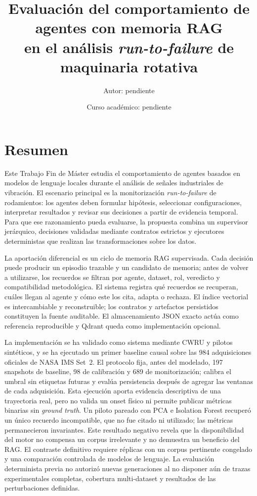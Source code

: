 \documentclass[12pt,a4paper]{report}
\title{
  Evaluación del comportamiento de agentes con memoria RAG\\
  en el análisis \textit{run-to-failure} de maquinaria rotativa
}
\author{Autor: pendiente}
\date{Curso académico: pendiente}
\begin{document}
\maketitle
\cleardoublepage{}

\chapter*{Resumen}
Este Trabajo Fin de Máster estudia el comportamiento de agentes basados en
modelos de lenguaje locales durante el análisis de señales industriales de
vibración. El escenario principal es la monitorización \textit{run-to-failure}
de rodamientos: los agentes deben formular hipótesis, seleccionar
configuraciones, interpretar resultados y revisar sus decisiones a partir de
evidencia temporal. Para que ese razonamiento pueda evaluarse, la propuesta
combina un supervisor jerárquico, decisiones validadas mediante contratos
estrictos y ejecutores deterministas que realizan las transformaciones sobre
los datos.

La aportación diferencial es un ciclo de memoria RAG supervisada. Cada decisión
puede producir un episodio trazable y un candidato de memoria; antes de volver a
utilizarse, los recuerdos se filtran por agente, dataset, rol, veredicto y
compatibilidad metodológica. El sistema registra qué recuerdos se recuperan,
cuáles llegan al agente y cómo este los cita, adapta o rechaza. El índice
vectorial es intercambiable y reconstruible; los contratos y artefactos
persistidos constituyen la fuente auditable. El almacenamiento JSON exacto
actúa como referencia reproducible y Qdrant queda como implementación opcional.

La implementación se ha validado como sistema mediante CWRU y pilotos
sintéticos, y se ha ejecutado un primer baseline causal sobre las 984
adquisiciones oficiales de NASA IMS Set~2. El protocolo fija, antes del
modelado, 197 snapshots de baseline, 98 de calibración y 689 de monitorización;
calibra el umbral sin etiquetas futuras y evalúa persistencia después de agregar
las ventanas de cada adquisición. Esta ejecución aporta evidencia descriptiva
de una trayectoria real, pero no valida un onset físico ni permite publicar
métricas binarias sin \textit{ground truth}. Un piloto pareado con PCA e
Isolation Forest recuperó un único recuerdo incompatible, que no fue citado ni
utilizado; las métricas permanecieron invariantes. Este resultado negativo
revela que la disponibilidad del motor no compensa un corpus irrelevante y no
demuestra un beneficio del RAG. El contraste definitivo requiere réplicas con
un corpus pertinente congelado y una comparación controlada de modelos de
lenguaje. La evaluación determinista previa no autorizó nuevas generaciones al
no disponer aún de trazas experimentales completas, cobertura multi-dataset y
resultados de las perturbaciones definidas.
\end{document}
